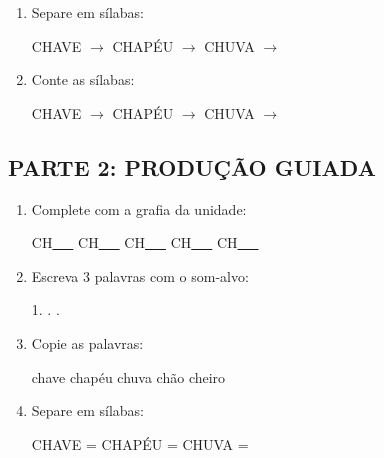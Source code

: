 \begin{exercicio}
\begin{enumerate}
  \item Separe em sílabas:
  \begin{center}
  CHAVE $\rightarrow$ \underline{\hspace{1cm}} \quad CHAPÉU $\rightarrow$ \underline{\hspace{1cm}} \quad CHUVA $\rightarrow$ \underline{\hspace{1cm}}
  \end{center}

  \item Conte as sílabas:
  \begin{center}
  CHAVE $\rightarrow$ \underline{\hspace{0.9cm}} \quad CHAPÉU $\rightarrow$ \underline{\hspace{0.9cm}} \quad CHUVA $\rightarrow$ \underline{\hspace{0.9cm}}
  \end{center}

\end{enumerate}

\subsection*{PARTE 2: PRODUÇÃO GUIADA}

\begin{enumerate}[resume]

  \item Complete com a grafia da unidade:
  \begin{center}
  CH\underline{~~~} \quad CH\underline{~~~} \quad CH\underline{~~~} \quad CH\underline{~~~} \quad CH\underline{~~~}
  \end{center}

  \item Escreva 3 palavras com o som-alvo:
  \begin{center}
  1. \underline{\hspace{3cm}} . \underline{\hspace{3cm}} . \underline{\hspace{3cm}}
  \end{center}

  \item Copie as palavras:
  \begin{center}
  chave \quad chapéu \quad chuva \quad chão \quad cheiro
  \end{center}

  \item Separe em sílabas:
  \begin{center}
  CHAVE = \underline{\hspace{1cm}} \underline{\hspace{1cm}} \quad CHAPÉU = \underline{\hspace{1cm}} \underline{\hspace{1cm}} \quad CHUVA = \underline{\hspace{1cm}} \underline{\hspace{1cm}}
  \end{center}


\end{enumerate}
\end{exercicio}

